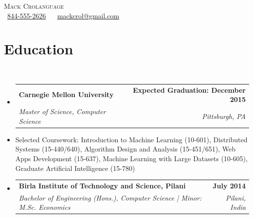 \documentclass[letterpaper,11pt]{article}
\makeatletter
\newcommand{\resumeItem}[1]{
  \item\small{
    {#1 \vspace{0pt}}
  }
}
\newcommand{\resumeSubheading}[4]{
  \vspace{-2pt}\item
    \begin{tabular*}{1.0\textwidth}[t]{l@{\extracolsep{\fill}}r}
      \textbf{#1} & \textbf{\small #2} \\
      \textit{\small#3} & \textit{\small #4} \\
    \end{tabular*}\vspace{-7pt}
}
\newcommand{\resumeSubHeadingListStart}{\begin{itemize}[leftmargin=0.0in, label={}]}
\newcommand{\resumeSubHeadingListEnd}{\end{itemize}}\vspace{0pt}
\newcommand{\resumeItemListStart}{\begin{itemize}}
\newcommand{\resumeItemListEnd}{\end{itemize}\vspace{-5pt}}
\makeatother
\begin{document}
\begin{center}
    {\Large \scshape Mack Crolanguage} \\[2mm]
    \footnotesize \raisebox{-0.1\height}
    \faPhone\ \underline{844-555-2626} ~ 
    {\faEnvelope\  \underline{mackcrol@gmail.com}} ~ 
    {\faLinkedin\ \underline{\href{}{}}}  ~
    {\faGithub\ \underline{\href{}{}}} ~
    {\faBriefcase\ \underline{\href{}{}}}
    \vspace{-8pt}
\end{center}

\section{Education} \\[1mm]
  \resumeSubHeadingListStart
    \resumeSubheading
      {Carnegie Mellon University}{Expected Graduation: December 2015}
      {Master of Science, Computer Science}{Pittsburgh, PA}
  \resumeSubHeadingListEnd
    \resumeItemListStart
        \resumeItem {Selected Coursework: Introduction to Machine Learning (10-601), Distributed Systems (15-440/640), Algorithm Design and Analysis (15-451/651), Web Apps Development (15-637), Machine Learning with Large Datasets (10-605), Graduate Artificial Intelligence (15-780)}
    \resumeItemListEnd

  \resumeSubHeadingListStart
    \resumeSubheading
      {Birla Institute of Technology and Science, Pilani}{July 2014}
      {Bachelor of Engineering (Hons.), Computer Science | Minor: M.Sc. Economics}{Pilani, India}
  \resumeSubHeadingListEnd

\end{document}
